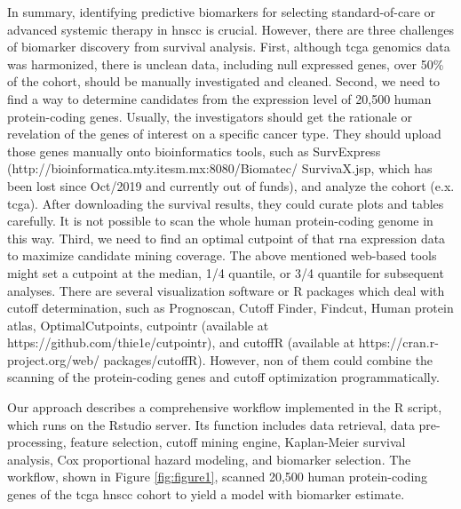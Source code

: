 \documentclass[jpm,article,submit,moreauthors,pdftex]{Definitions/mdpi}
\begin{document}
In summary, identifying predictive biomarkers for selecting standard-of-care or advanced systemic therapy\cite{Cristina2019} in \acrshort{hnscc} is crucial. 
However, there are three challenges of biomarker discovery from survival analysis.
First, although \acrshort{tcga} genomics data was harmonized, there is unclean data, including null expressed genes, over 50\% of the cohort, should be manually investigated and cleaned.
Second, we need to find a way to determine candidates from the expression level of 20,500 human protein-coding genes\cite{Clamp2007}. Usually, the investigators should get the rationale or revelation of the genes of interest on a specific cancer type. They should upload those genes manually onto bioinformatics tools, such as SurvExpress (http://bioinformatica.mty.itesm.mx:8080/Biomatec/ \newline
SurvivaX.jsp\cite{Aguirre-Gamboa2013}, which has been lost since Oct/2019 and currently out of funds), and analyze the cohort (e.x. \acrshort{tcga}). After downloading the survival results, they could curate plots and tables carefully.
It is not possible to scan the whole human protein-coding genome in this way.
Third, we need to find an optimal cutpoint of that \acrshort{rna} expression data to maximize candidate mining coverage. The above mentioned web-based tools might set a cutpoint at the median, 1/4 quantile, or 3/4 quantile for subsequent analyses. There are several visualization software or R packages which deal with cutoff determination, such as Prognoscan\cite{Mizuno2009a}, Cutoff Finder\cite{Budczies2012}, Findcut\cite{Chang2017a}, Human protein atlas\cite{Uhlen2017}, OptimalCutpoints\cite{Cristina2019},  cutpointr (available at https://github.com/thie1e/cutpointr), and cutoffR (available at https://cran.r-project.org/web/
packages/cutoffR). However, non of them could combine the scanning of the protein-coding genes and cutoff optimization programmatically.

Our approach describes a comprehensive workflow implemented in the R script, which runs on the Rstudio server.
Its function includes data retrieval, data pre-processing, feature selection, cutoff mining engine, Kaplan-Meier survival analysis, Cox proportional hazard modeling, and biomarker selection.
The workflow, shown in Figure \ref{fig:figure1}, scanned 20,500 human protein-coding genes of the \acrshort{tcga} \acrshort{hnscc} cohort to yield a model with biomarker estimate.

\end{document}
